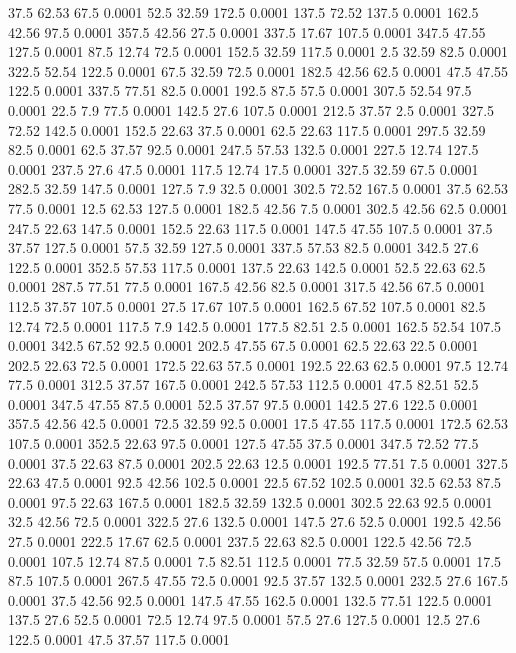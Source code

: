 37.5	62.53	67.5	0.0001
52.5	32.59	172.5	0.0001
137.5	72.52	137.5	0.0001
162.5	42.56	97.5	0.0001
357.5	42.56	27.5	0.0001
337.5	17.67	107.5	0.0001
347.5	47.55	127.5	0.0001
87.5	12.74	72.5	0.0001
152.5	32.59	117.5	0.0001
2.5	32.59	82.5	0.0001
322.5	52.54	122.5	0.0001
67.5	32.59	72.5	0.0001
182.5	42.56	62.5	0.0001
47.5	47.55	122.5	0.0001
337.5	77.51	82.5	0.0001
192.5	87.5	57.5	0.0001
307.5	52.54	97.5	0.0001
22.5	7.9	77.5	0.0001
142.5	27.6	107.5	0.0001
212.5	37.57	2.5	0.0001
327.5	72.52	142.5	0.0001
152.5	22.63	37.5	0.0001
62.5	22.63	117.5	0.0001
297.5	32.59	82.5	0.0001
62.5	37.57	92.5	0.0001
247.5	57.53	132.5	0.0001
227.5	12.74	127.5	0.0001
237.5	27.6	47.5	0.0001
117.5	12.74	17.5	0.0001
327.5	32.59	67.5	0.0001
282.5	32.59	147.5	0.0001
127.5	7.9	32.5	0.0001
302.5	72.52	167.5	0.0001
37.5	62.53	77.5	0.0001
12.5	62.53	127.5	0.0001
182.5	42.56	7.5	0.0001
302.5	42.56	62.5	0.0001
247.5	22.63	147.5	0.0001
152.5	22.63	117.5	0.0001
147.5	47.55	107.5	0.0001
37.5	37.57	127.5	0.0001
57.5	32.59	127.5	0.0001
337.5	57.53	82.5	0.0001
342.5	27.6	122.5	0.0001
352.5	57.53	117.5	0.0001
137.5	22.63	142.5	0.0001
52.5	22.63	62.5	0.0001
287.5	77.51	77.5	0.0001
167.5	42.56	82.5	0.0001
317.5	42.56	67.5	0.0001
112.5	37.57	107.5	0.0001
27.5	17.67	107.5	0.0001
162.5	67.52	107.5	0.0001
82.5	12.74	72.5	0.0001
117.5	7.9	142.5	0.0001
177.5	82.51	2.5	0.0001
162.5	52.54	107.5	0.0001
342.5	67.52	92.5	0.0001
202.5	47.55	67.5	0.0001
62.5	22.63	22.5	0.0001
202.5	22.63	72.5	0.0001
172.5	22.63	57.5	0.0001
192.5	22.63	62.5	0.0001
97.5	12.74	77.5	0.0001
312.5	37.57	167.5	0.0001
242.5	57.53	112.5	0.0001
47.5	82.51	52.5	0.0001
347.5	47.55	87.5	0.0001
52.5	37.57	97.5	0.0001
142.5	27.6	122.5	0.0001
357.5	42.56	42.5	0.0001
72.5	32.59	92.5	0.0001
17.5	47.55	117.5	0.0001
172.5	62.53	107.5	0.0001
352.5	22.63	97.5	0.0001
127.5	47.55	37.5	0.0001
347.5	72.52	77.5	0.0001
37.5	22.63	87.5	0.0001
202.5	22.63	12.5	0.0001
192.5	77.51	7.5	0.0001
327.5	22.63	47.5	0.0001
92.5	42.56	102.5	0.0001
22.5	67.52	102.5	0.0001
32.5	62.53	87.5	0.0001
97.5	22.63	167.5	0.0001
182.5	32.59	132.5	0.0001
302.5	22.63	92.5	0.0001
32.5	42.56	72.5	0.0001
322.5	27.6	132.5	0.0001
147.5	27.6	52.5	0.0001
192.5	42.56	27.5	0.0001
222.5	17.67	62.5	0.0001
237.5	22.63	82.5	0.0001
122.5	42.56	72.5	0.0001
107.5	12.74	87.5	0.0001
7.5	82.51	112.5	0.0001
77.5	32.59	57.5	0.0001
17.5	87.5	107.5	0.0001
267.5	47.55	72.5	0.0001
92.5	37.57	132.5	0.0001
232.5	27.6	167.5	0.0001
37.5	42.56	92.5	0.0001
147.5	47.55	162.5	0.0001
132.5	77.51	122.5	0.0001
137.5	27.6	52.5	0.0001
72.5	12.74	97.5	0.0001
57.5	27.6	127.5	0.0001
12.5	27.6	122.5	0.0001
47.5	37.57	117.5	0.0001
